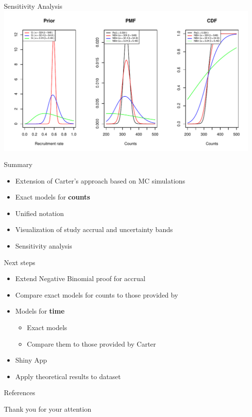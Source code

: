 \documentclass[english]{beamer}\usepackage[]{graphicx}\usepackage[]{xcolor}
\makeatletter
\def\maxwidth{ %
  \ifdim\Gin@nat@width>\linewidth
    \linewidth
  \else
    \Gin@nat@width
  \fi
}
\newenvironment{knitrout}{}{} %
\makeatother
\begin{document}
\begin{frame}{Sensitivity Analysis}
\begin{knitrout}
\color{fgcolor}
\includegraphics[width=\maxwidth]{figures/figunnamed-chunk-13-1} 
\end{knitrout}

\end{frame}




\begin{frame}{Summary}
\begin{itemize}
\item Extension of Carter's approach based on MC simulations
\item Exact models for \textbf{counts}
\item Unified notation
\item Visualization of study accrual and uncertainty bands 
\item Sensitivity analysis
\end{itemize}

\end{frame}


\begin{frame}{Next steps}
\begin{itemize}
\item Extend Negative Binomial proof for accrual 
\item Compare exact models for counts to those provided by \cite{carter2004application}
\item Models for \textbf{time} 
	\begin{itemize}
	\item Exact models
	\item Compare them to those provided by Carter
	\end{itemize}
\item Shiny App
\item Apply theoretical results to dataset
\end{itemize}

\end{frame}

\begin{frame}{References}
  \small
  

\end{frame}


\begin{frame}{Thank you for your attention}

\end{frame}


\end{document}
